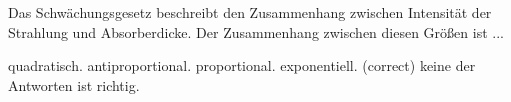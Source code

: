 \documentclass[11pt]{exam}
\begin{document}
\begin{questions}
\vspace{3mm}\question Das Schwächungsgesetz beschreibt den Zusammenhang zwischen Intensität der Strahlung und Absorberdicke. Der Zusammenhang zwischen diesen Größen ist ...

\begin{choices}
	\choice quadratisch.
	\choice antiproportional.
	\choice proportional.
	\choice exponentiell. (correct)
	\choice keine der Antworten ist richtig.
\end{choices}

\vspace{3mm}\end{questions}
\end{document}
